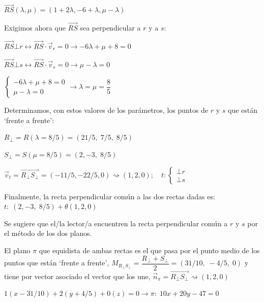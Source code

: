 \begin{proofw}
\noindent $ \overrightarrow{RS}(\lambda, \mu)=(1+2\lambda, -6+\lambda, \mu-\lambda) $

\noindent Exigimos ahora que $\overrightarrow{RS}$ sea perpendicular a $r$ y a $s$:

\noindent $\overrightarrow{RS}\bot r \leftrightarrow \overrightarrow{RS}\cdot \vec v_r=0 \to -6\lambda+\mu+8=0$

\noindent $\overrightarrow{RS} \bot s \leftrightarrow \overrightarrow{RS} \cdot \vec v_s=0 \to \mu-\lambda=0$

\noindent $\begin{cases} -6\lambda+\mu+8=0 \\ \mu-\lambda =0 \end{cases} \to \lambda=\mu=\dfrac 8 5$

\noindent Determinamos, con estos valores de los parámetros, los puntos de $r$ y $s$ que están `frente a frente':

\noindent $R_\bot=R(\lambda=8/5)=(21/5,\; 7/5,\; 8/5)$

\noindent $S_\bot=S(\mu=8/5)=(2,-3,\; 8/5)$

\noindent $\vec v_t=\overrightarrow{R_\bot S_\bot}=(-11/5,-22/5,0) \rightsquigarrow  (1,2,0); \quad t:\begin{cases} \bot r \\ \bot s \end{cases}$

\noindent Finalmente, la recta perpendicular común a las dos rectas dadas es: $t:\; (2,-3,\; 8/5)+\theta (1,2,0)$

\noindent \textcolor{gris}{Se sugiere que el/la lector/a encuentren la recta perpendicular común a $r$ y $s$ por el método de los dos planos.}

\noindent El plano $\pi$ que equidista de ambas rectas es el que pasa por el punto medio de los puntos que están `frente a frente', $M_{R_\bot S_\bot}=\dfrac {R_\bot + S_\bot}{2}=(31/10,\; -4/5, \;0)$ y tiene por vector asociado el vector que los une, $\vec n_{\pi}= \overrightarrow{R_\bot S_\bot}  \rightsquigarrow  (1,2,0)$

\noindent $1(x-31/10)+2(y+4/5)+0(z)=0 \to \pi:\; 10x+20y-47=0$
\end{proofw}



